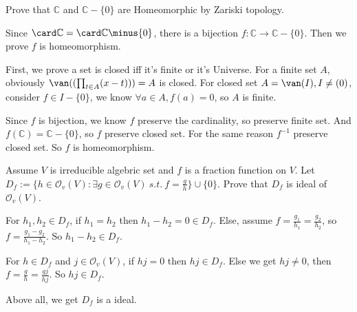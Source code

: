 \documentclass{ctexart}
\newif\ifpreface
\begin{document}
\large
\setlength{\baselineskip}{1.2em}
\ifpreface
    
\newgeometry{left=2cm,right=2cm,top=2cm,bottom=2cm}
\else
{}
\maketitle
\fi
\begin{problem}
 Prove that $\mathbb{C}$ and $\mathbb{C}\minus\{0\}$ are Homeomorphic by Zariski topology. 
\end{problem}

\begin{solution}
 Since $\card \mathbb{C}=\card \mathbb{C}\minus \{0\}$, there is a bijection $f:\mathbb{C}\to \mathbb{C}\minus\{0\}$. Then we prove $f$ is homeomorphism. 
 
 First, we prove a set is closed iff it's finite or it's Universe. For a finite set $A$, obviously $\van((\prod_{t\in A}(x-t)))=A$ is closed. For closed set $A=\van(I),I\neq (0)$, consider $f\in I\minus\{0\}$, we know $\forall a\in A,f(a)=0$, so $A$ is finite. 

 Since $f$ is bijection, we know $f$ preserve the cardinality, so preserve finite set. And $f(\mathbb{C})=\mathbb{C}\minus\{0\}$, so $f$ preserve closed set. For the same reason $f^{-1}$ preserve closed set. So $f$ is homeomorphism.  
\end{solution}

\begin{problem}
 Assume $V$ is irreducible algebric set and $f$ is a fraction function on $V$. Let $D_f:=\{h\in \mathcal{O}_v(V):\exists g\in \mathcal{O}_v(V)\ s.t.\ f=\frac{g}{h}\}\cup\{0\}$. Prove that $D_f$ is ideal of $\mathcal{O}_v(V)$. 
\end{problem}

\begin{solution}
 For $h_1,h_2\in D_f$, if $h_1=h_2$ then $h_1-h_2=0\in D_f$. Else, assume $f=\frac{g_1}{h_1}=\frac{g_2}{h_2}$, so $f=\frac{g_1-g_2}{h_1-h_2}$. So $h_1-h_2\in D_f$. 

 For $h\in D_f$ and $j\in \mathcal{O}_v(V)$, if $hj=0$ then $hj\in D_f$. Else we get $hj\neq 0$, then $f=\frac{g}{h}=\frac{gj}{hj}$. So $hj\in D_f$. 

 Above all, we get $D_f$ is a ideal. 
\end{solution}
\end{document}
